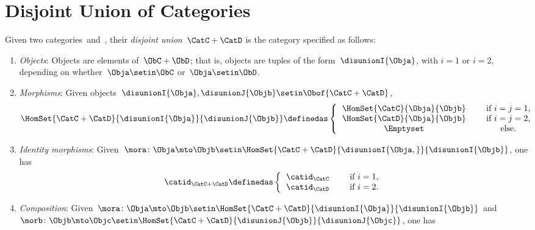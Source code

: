 
\section{Disjoint Union of Categories}

\begin{ctdefinition}
    \label{def:disjoint-union-category}
    Given two categories~\CatC and~\CatD, their \emph{disjoint union}~$\CatC + \CatD$ is the category specified as follows:
    \begin{enumerate}
        \item \emph{Objects}: Objects are elements of~$\ObC + \ObD$; that is, objects are tuples of the form~$\disunionI{\Obja}$, with $i=1$ or $i=2$, depending on whether~$\Obja \setin \ObC$ or~$\Obja \setin \ObD$.
        \item \emph{Morphisms}: Given objects~$\disunionI{\Obja}, \disunionJ{\Objb} \setin \Obof{\CatC + \CatD}$,
              \begin{equation}
                  \HomSet{\CatC + \CatD}{\disunionI{\Obja}}{\disunionJ{\Objb}} \definedas
                  \left\{
                  \begin{tabular}{ccc}
                      $\HomSet{\CatC}{\Obja}{\Objb}$ &  & if $i=j = 1$, \\
                      $\HomSet{\CatD}{\Obja}{\Objb}$ &  & if $i = j =2$, \\
                      $\Emptyset$                    &  & else.
                  \end{tabular}
                  \right.
              \end{equation}
        \item \emph{Identity morphisms}: Given~$\mora\colon \Obja \mto \Objb\setin \HomSet{\CatC + \CatD}{\disunionI{\Obja, }}{\disunionI{\Objb}}$, one has
              \begin{equation}
                  \catid_{\CatC+\CatD} \definedas
                  \left\{
                  \begin{tabular}{ccc}
                      $\catid_\CatC$ &  & if $i=1$, \\
                      $\catid_\CatD$ &  & if $i=2$.
                  \end{tabular}
                  \right.
              \end{equation}
        \item \emph{Composition}: Given~$\mora\colon \Obja \mto \Objb\setin \HomSet{\CatC + \CatD}{\disunionI{\Obja}}{\disunionI{\Objb}}$ and~$\morb\colon \Objb\mto \Objc\setin \HomSet{\CatC + \CatD}{\disunionJ{\Objb}}{\disunionJ{\Objc}}$, one has

\end{enumerate}
\end{ctdefinition}
